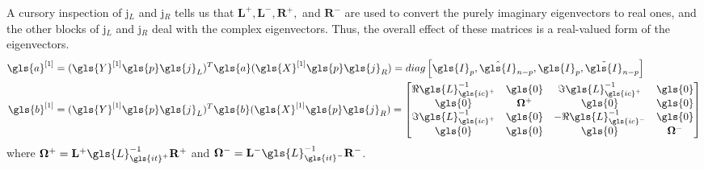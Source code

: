A cursory inspection of \gls{j}$_L$ and \gls{j}$_R$ tells us that 
$\mathbf{L}^+, \mathbf{L}^-, \mathbf{R}^+, $ and $\mathbf{R}^-$ are used
to convert the purely imaginary eigenvectors to real ones, and the other
blocks of \gls{j}$_L$ and \gls{j}$_R$ deal with the complex eigenvectors.
Thus, the overall effect of these matrices is a real-valued form of the 
eigenvectors.
\begin{align}
	\gls{a}^{[1]} &= (\gls{Y}^{[1]}\gls{p}\gls{j}_L)^T\gls{a}(\gls{X}^{[1]}\gls{p}\gls{j}_R) = diag\left[\gls{I}_p, \hat{\gls{I}}_{n-p}, \gls{I}_p,\tilde{\gls{I}}_{n-p}\right]\\
	\gls{b}^{[1]} &= (\gls{Y}^{[1]}\gls{p}\gls{j}_L)^T\gls{b}(\gls{X}^{[1]}\gls{p}\gls{j}_R) = \begin{bmatrix}
		\Re{\gls{L}_{\gls{ic}^+}^{-1}} & \gls{0} & \Im{\gls{L}_{\gls{ic}^+}^{-1}} & \gls{0}\\
		\gls{0} & \mathbf{\Omega}^+ & \gls{0} & \gls{0} \\
		\Im{\gls{L}_{\gls{ic}^+}^{-1}} & \gls{0} & -\Re{\gls{L}_{\gls{ic}^-}^{-1}} & \gls{0}\\
		\gls{0} & \gls{0} & \gls{0} & \mathbf{\Omega}^- \\
	\end{bmatrix}
\end{align}
where $\mathbf{\Omega}^+ = \mathbf{L}^+\gls{L}_{\gls{it}^+}^{-1}\mathbf{R}^+$ and 
$\mathbf{\Omega}^- = \mathbf{L}^-\gls{L}_{\gls{it}^-}^{-1}\mathbf{R}^-$.

